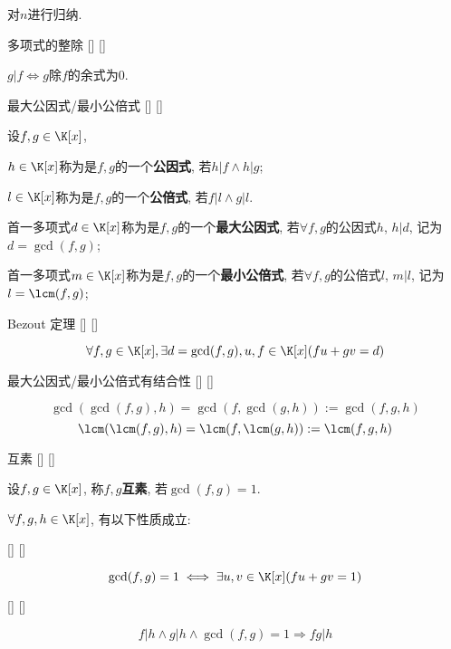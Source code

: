 \documentclass[UTF8]{ctexart}
\begin{document}
        \begin{prf}
			对$n$进行归纳. 
        \end{prf}
        
		\begin{ppt}
			[]
			{多项式的整除}
			[]
			[]

			$g|f\iff g$除$f$的余式为$0$. 
		\end{ppt}
		
		\begin{dfn}
			[]
			{最大公因式/最小公倍式}
			[]
			[]

			设$f,g\in\K[x]$, 
			
			$h\in\K[x]$称为是$f,g$的一个\textbf{公因式}, 若$h|f\wedge h|g$; 
			
			$l\in\K[x]$称为是$f,g$的一个\textbf{公倍式}, 若$f|l\wedge g|l$. 

			首一多项式$d\in\K[x]$称为是$f,g$的一个\textbf{最大公因式}, 若$\forall f,g$的公因式$h$, $h|d$, 记为$d=\gcd(f,g)$; 

			首一多项式$m\in\K[x]$称为是$f,g$的一个\textbf{最小公倍式}, 若$\forall f,g$的公倍式$l$, $m|l$, 记为$l=\lcm(f,g)$; 
		\end{dfn}
		
		\begin{thm}
			[]
			{Bezout 定理}
			[]
			[]

			\[\forall f,g\in\K[x], \exists d=\gcd(f,g), u,f\in\K[x](fu+gv=d)\]
		\end{thm}
		
		\begin{ppt}
			[]
			{最大公因式/最小公倍式有结合性}
			[]
			[]

			\[\gcd(\gcd(f,g),h)=\gcd(f,\gcd(g,h)):=\gcd(f,g,h)\]
			\[\lcm(\lcm(f,g),h)=\lcm(f,\lcm(g,h)):=\lcm(f,g,h)\]
		\end{ppt}
		
		\begin{dfn}
			[]
			{互素}
			[]
			[]

			设$f,g\in\K[x]$, 称$f,g$\textbf{互素}, 若$\gcd(f,g)=1$. 
		\end{dfn}

		$\forall f,g,h\in\K[x]$, 有以下性质成立: 
		
		\begin{ppt}
			[]
			{}
			[]
			[]
			
			\[\gcd(f,g)=1\iff\exists u,v\in\K[x](fu+gv=1)\]
		\end{ppt}
		
		\begin{ppt}
			[]
			{}
			[]
			[]
			
			\[f|h\wedge g|h\wedge\gcd(f,g)=1\Longrightarrow fg|h\]
		\end{ppt}
		
\end{document}

